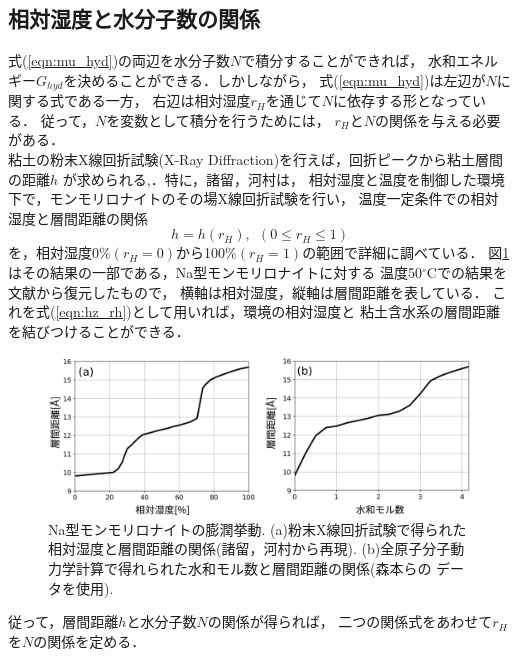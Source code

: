 \subsection{相対湿度と水分子数の関係}
式(\ref{eqn:mu_hyd})の両辺を水分子数\(N\)で積分することができれば，
水和エネルギー\(G_{hyd}\)を決めることができる．しかしながら，
式(\ref{eqn:mu_hyd})は左辺が\(N\)に関する式である一方，
右辺は相対湿度\(r_H\)を通じて\(N\)に依存する形となっている．
従って，$N$を変数として積分を行うためには，
\(r_H\)と\(N\)の関係を与える必要がある．\\
\hspace{\parindent}
粘土の粉末X線回折試験(X-Ray Diffraction)を行えば，回折ピークから粘土層間の距離\(h\)
が求められる\cite{Morodome},\cite{Yamada}．特に，諸留，河村\cite{Morodome}は，
相対湿度と温度を制御した環境下で，モンモリロナイトのその場X線回折試験を行い，
温度一定条件での相対湿度と層間距離の関係
\begin{equation}
	h=h(r_H), \ \ (0 \leq r_H \leq 1)
	\label{eqn:hz_rh}
\end{equation}
を，相対湿度0$\% (r_H=0)$から100$\% (r_H=1)$の範囲で詳細に調べている．
図\ref{fig:fig1}はその結果の一部である，Na型モンモリロナイトに対する
温度50\(^\circ\)Cでの結果を文献\cite{Morodome}から復元したもので，
横軸は相対湿度，縦軸は層間距離を表している．
これを式(\ref{eqn:hz_rh})として用いれば，環境の相対湿度と
粘土含水系の層間距離を結びつけることができる．
\begin{figure}[h]
	\begin{center}
	\includegraphics[width=1.0\linewidth]{Figs/fig1.pdf} 
	\end{center}
	\caption{
		Na型モンモリロナイトの膨潤挙動.
		(a)粉末X線回折試験で得られた相対湿度と層間距離の関係(諸留，河村\cite{Morodome}から再現).
		(b)全原子分子動力学計算で得れられた水和モル数と層間距離の関係(森本ら\cite{Morimoto}の
		データを使用). 
	} 
	\label{fig:fig1}
\end{figure}
従って，層間距離\(h\)と水分子数\(N\)の関係が得られば，
二つの関係式をあわせて\(r_H\)を\(N\)の関係を定める．
